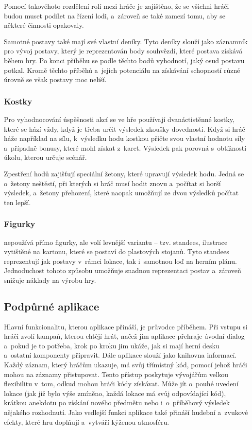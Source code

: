Pomocí takovéhoto rozdělení rolí mezi hráče je zajištěno, že se všichni hráči budou muset podílet na řízení lodi, a~zároveň se také zamezí tomu, aby se některé činnosti opakovaly.

Samotné postavy také mají své vlastní deníky. Tyto deníky slouží jako záznamník pro vývoj postavy, který je reprezentován body souhvězdí, které postava získává během hry. Po konci příběhu se podle těchto bodů vyhodnotí, jaký osud postavu potkal. Kromě těchto příběhů a~jejich potenciálu na získávání schopností různé úrovně se však postavy moc neliší.

\subsubsection*{Kostky}
\label{subsubsec:fw_comp_dice}

Pro vyhodnocování úspěšnosti akcí se ve hře používají dvanáctistěnné kostky, které se hází vždy, když je třeba určit výsledek zkoušky dovednosti. Když si hráč háže například na sílu, k~výsledku hodu kostkou přičte svou vlastní hodnotu síly a~případně bonusy, které mohl získat z~karet. Výsledek pak porovná s~obtížností úkolu, kterou určuje scénář.

Zpestření hodů zajišťují speciální žetony, které upravují výsledek hodu. Jedná se o~žetony neštěstí, při kterých si hráč musí hodit znovu a~počítat si horší výsledek, a~žetony přehození, které naopak umožňují ze dvou výsledků počítat ten lepší. 

\subsubsection*{Figurky}
\label{subsubsec:fw_comp_figures}

 nepoužívá přímo figurky, ale volí levnější variantu -- tzv. standees, ilustrace vytištěné na kartonu, které se postaví do plastových stojanů. Tyto standees reprezentují jak postavy v~rámci lokace, tak i~samotnou loď na herním plánu. Jednoduchost tohoto způsobu umožňuje snadnou reprezentaci postav a~zároveň snižuje náklady na výrobu hry.


\subsection{Podpůrné aplikace}
\label{subsec:fw_apps}

Hlavní funkcionalitu, kterou aplikace přináší, je průvodce příběhem. Při vstupu si hráči zvolí kampaň, kterou chtějí hrát, načež jim aplikace přehraje úvodní dialog a~pokud je to potřeba, krok po kroku jim ukáže, jak si mají herní desku a~ostatní komponenty připravit. Dále aplikace slouží jako knihovna informací. Každý záznam, který hráčům ukazuje, má svůj třímístný kód, pomocí jehož hráči mohou na záznamy přistupovat. Tento přístup poskytuje vývojářům velkou flexibilitu v~tom, odkud mohou hráči kódy získávat. Může jít o~pouhé uvedení lokace (jak již bylo výše zmíněno, každá lokace má svůj odpovídající kód), krátkou anekdotu po získání nového předmětu nebo i~o~příběhový výsledek nějakého rozhodnutí. Jako vedlejší funkci aplikace také přináší hudební a~zvukové efekty, které hru doplňují a~vytváří kýženou atmosféru. \cite{fw_crossroads_app}

